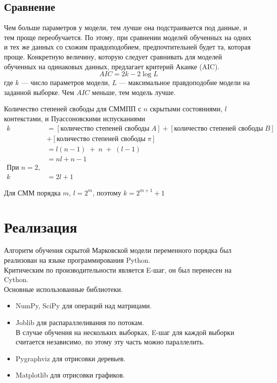 \documentclass{matmex-diploma-custom}
\begin{document}
\subsection{Сравнение}
Чем больше параметров у модели, тем лучше она подстраивается под данные, и тем проще переобучается. 
По этому, при сравнении моделей обученных на одних и тех же данных со схожим правдоподобием, предпочтительней будет та, которая проще. 
Конкретную величину, которую следует сравнивать для моделей обученных на одинаковых данных, предлагает критерий Акаике (AIC).
$$ AIC = 2k-2\log{L} $$ 
где $ k $ --- число параметров модели, $ L $ --- максимальное правдоподобие модели на заданной выборке. Чем $AIC$ меньше, тем модель лучше. 

Количество степеней свободы для СММПП с $ n $ скрытыми состояниями, $ l $ контекстами, и Пуассоновскими испусканиями 
\begin{align*}
k &= [\text{количество степеней свободы} \; A ] 
+ [\text{количество степеней свободы} \; B ]
\\&+ [\text{количество степеней свободы} \; \pi ]
\\ &= l(n-1)\;+\;n\;+\;(l-1) \\&= nl + n - 1
\\
\text{При } n=2,
\\k &= 2l + 1
\end{align*}

Для СММ порядка $m$, $l=2^m$, поэтому $k = 2^{m+1}+1$

\section{Реализация}
Алгоритм обучения скрытой Марковской модели переменного порядка был реализован на языке программирования Python. 
\\
Критическим по производительности является E-шаг, он был перенесен на Cython.
\\
Основные использованные библиотеки.
\begin{itemize}
\item
NumPy, SciPy для операций над матрицами.
\item
Joblib для распараллеливания по потокам.
\\
В случае обучения на нескольких выборках, E-шаг для каждой выборки считается независимо, по этому эту часть можно параллелить.
\item
Pygraphviz для отрисовки деревьев. 
\item
Matplotlib для отрисовки графиков.
\end{itemize}
\end{document}
